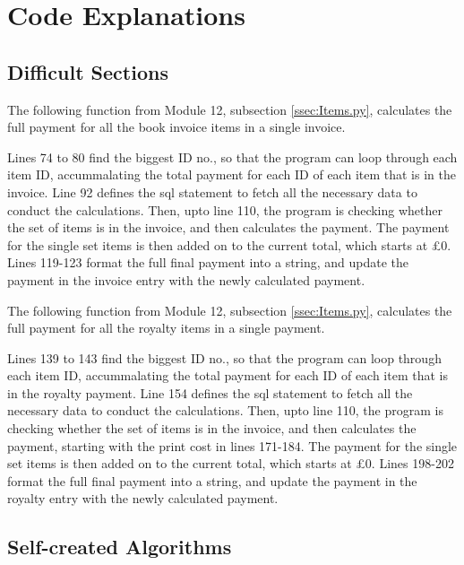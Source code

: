 \section{Code Explanations}

\subsection{Difficult Sections}

The following function from Module 12, subsection \ref{ssec:Items.py}, calculates the full payment for all the book invoice items in a single invoice.
\begin{tiny}
\end{tiny} 
Lines 74 to 80 find the biggest ID no., so that the program can loop through each item ID, accummalating the total payment for each ID of each item that is in the invoice. Line 92 defines the sql statement to fetch all the necessary data to conduct the calculations. Then, upto line 110, the program is checking whether the set of items is in the invoice, and then calculates the payment. The payment for the single set items is then added on to the current total, which starts at £0. Lines 119-123 format the full final payment into a string, and update the payment in the invoice entry with the newly calculated payment.

The following function from Module 12, subsection \ref{ssec:Items.py}, calculates the full payment for all the royalty items in a single payment.
\begin{tiny}
\end{tiny}
Lines 139 to 143 find the biggest ID no., so that the program can loop through each item ID, accummalating the total payment for each ID of each item that is in the royalty payment. Line 154 defines the sql statement to fetch all the necessary data to conduct the calculations. Then, upto line 110, the program is checking whether the set of items is in the invoice, and then calculates the payment, starting with the print cost in lines 171-184. The payment for the single set items is then added on to the current total, which starts at £0. Lines 198-202 format the full final payment into a string, and update the payment in the royalty entry with the newly calculated payment.

\subsection{Self-created Algorithms}

